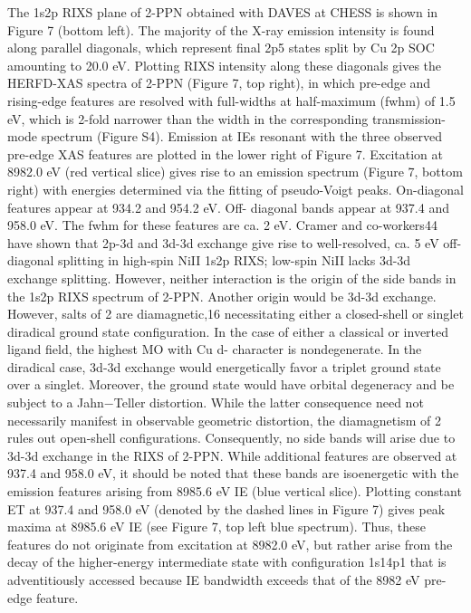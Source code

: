 The 1s2p RIXS plane of 2-PPN obtained with DAVES at
CHESS is shown in Figure 7 (bottom left). The majority of the
X-ray emission intensity is found along parallel diagonals, which
represent ﬁnal 2p5 states split by Cu 2p SOC amounting to 20.0
eV. Plotting RIXS intensity along these diagonals gives the
HERFD-XAS spectra of 2-PPN (Figure 7, top right), in which
pre-edge and rising-edge features are resolved with full-widths
at half-maximum (fwhm) of 1.5 eV, which is 2-fold narrower
than the width in the corresponding transmission-mode
spectrum (Figure S4). Emission at IEs resonant with the
three observed pre-edge XAS features are plotted in the lower
right of Figure 7. Excitation at 8982.0 eV (red vertical slice)
gives rise to an emission spectrum (Figure 7, bottom right)
with energies determined via the ﬁtting of pseudo-Voigt peaks.
On-diagonal features appear at 934.2 and 954.2 eV. Oﬀ-
diagonal bands appear at 937.4 and 958.0 eV. The fwhm for
these features are ca. 2 eV.
Cramer and co-workers44 have shown that 2p-3d and 3d-3d
exchange give rise to well-resolved, ca. 5 eV oﬀ-diagonal
splitting in high-spin NiII 1s2p RIXS; low-spin NiII lacks 3d-3d
exchange splitting. However, neither interaction is the origin of
the side bands in the 1s2p RIXS spectrum of 2-PPN. Another
origin would be 3d-3d exchange. However, salts of 2 are
diamagnetic,16 necessitating either a closed-shell or singlet
diradical ground state conﬁguration. In the case of either a
classical or inverted ligand ﬁeld, the highest MO with Cu d-
character is nondegenerate. In the diradical case, 3d-3d
exchange would energetically favor a triplet ground state over
a singlet. Moreover, the ground state would have orbital
degeneracy and be subject to a Jahn−Teller distortion. While
the latter consequence need not necessarily manifest in
observable geometric distortion, the diamagnetism of 2 rules
out open-shell conﬁgurations. Consequently, no side bands will
arise due to 3d-3d exchange in the RIXS of 2-PPN. While
additional features are observed at 937.4 and 958.0 eV, it
should be noted that these bands are isoenergetic with the
emission features arising from 8985.6 eV IE (blue vertical slice).
Plotting constant ET at 937.4 and 958.0 eV (denoted by the
dashed lines in Figure 7) gives peak maxima at 8985.6 eV IE
(see Figure 7, top left blue spectrum). Thus, these features do
not originate from excitation at 8982.0 eV, but rather arise from
the decay of the higher-energy intermediate state with
conﬁguration 1s14p1 that is adventitiously accessed because
IE bandwidth exceeds that of the 8982 eV pre-edge feature.
